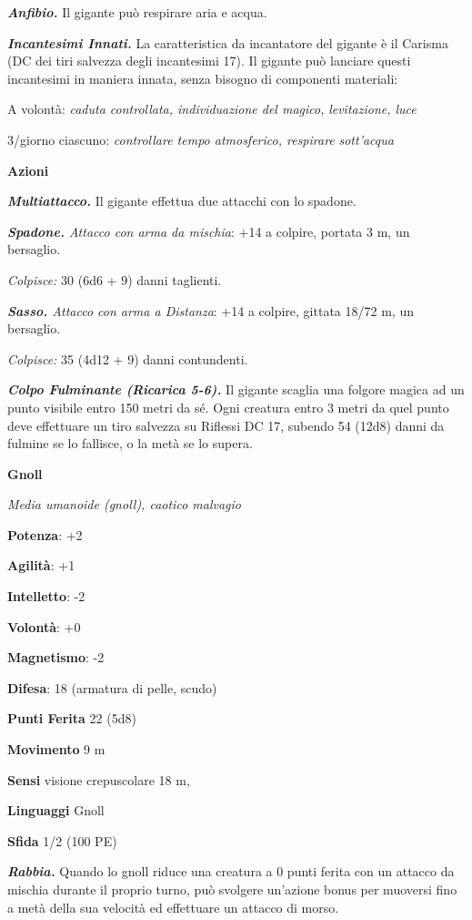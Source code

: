 \begin{multicols}{2}
\emph{\textbf{Anfibio.}} Il gigante può respirare aria e acqua.

\emph{\textbf{Incantesimi Innati.}} La caratteristica da incantatore del
gigante è il Carisma (DC dei tiri salvezza degli incantesimi 17). Il
gigante può lanciare questi incantesimi in maniera innata, senza bisogno
di componenti materiali:

A volontà: \emph{caduta controllata, individuazione del magico,}
\emph{levitazione, luce}

3/giorno ciascuno: \emph{controllare tempo atmosferico, respirare}
\emph{sott'acqua}

\textbf{Azioni}

\emph{\textbf{Multiattacco.}} Il gigante effettua due attacchi con lo
spadone.

\emph{\textbf{Spadone.} Attacco con arma da mischia}: +14 a colpire,
portata 3 m, un bersaglio.

\emph{Colpisce:} 30 (6d6 + 9) danni taglienti.

\emph{\textbf{Sasso.} Attacco con arma a Distanza}: +14 a colpire,
gittata 18/72 m, un bersaglio.

\emph{Colpisce:} 35 (4d12 + 9) danni contundenti.

\emph{\textbf{Colpo Fulminante (Ricarica 5-6).}} Il gigante scaglia una
folgore magica ad un punto visibile entro 150 metri da sé. Ogni creatura
entro 3 metri da quel punto deve effettuare un tiro salvezza su Riflessi DC 17, subendo 54 (12d8) danni da fulmine se lo fallisce, o la
metà se lo supera.



\textbf{Gnoll}

\emph{Media umanoide (gnoll), caotico malvagio}

\textbf{Potenza}: +2

\textbf{Agilità}: +1

\textbf{Intelletto}: -2

\textbf{Volontà}: +0

\textbf{Magnetismo}: -2

\textbf{Difesa}: 18 (armatura di pelle, scudo)

\textbf{Punti Ferita} 22 (5d8)

\textbf{Movimento} 9 m

\textbf{Sensi} visione crepuscolare 18 m, 

\textbf{Linguaggi} Gnoll

\textbf{Sfida} 1/2 (100 PE)

\emph{\textbf{Rabbia.}} Quando lo gnoll riduce una creatura a 0 punti
ferita con un attacco da mischia durante il proprio turno, può svolgere
un'azione bonus per muoversi fino a metà della sua velocità ed
effettuare un attacco di morso.


\end{multicols}
